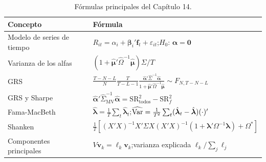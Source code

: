 \begin{table}[H]
\centering\small
\begin{tabular}{@{}ll@{}}
\toprule
Concepto & Fórmula \\
\midrule
Modelo de series de tiempo & $R_{it}=\alpha_i+\boldsymbol\beta_i'\mathbf f_t+\varepsilon_{it}$;\quad $H_0$: $\boldsymbol\alpha=\mathbf 0$ \\
Varianza de los alfas & $(1+\hat{\boldsymbol\mu}'\hat\Omega^{-1}\hat{\boldsymbol\mu})\Sigma/T$ \\
GRS & $\frac{T-N-L}{N}\frac{T}{T-L-1}\frac{\hat{\boldsymbol\alpha}'\hat\Sigma^{-1}\hat{\boldsymbol\alpha}}{1+\hat{\boldsymbol\mu}'\hat\Omega^{-1}\hat{\boldsymbol\mu}}\sim F_{N,T-N-L}$ \\
GRS y Sharpe & $\hat{\boldsymbol\alpha}'\hat\Sigma_{\text{MV}}^{-1}\hat{\boldsymbol\alpha}=\mathrm{SR}^2_{\text{todos}}-\mathrm{SR}^2_f$ \\
Fama-MacBeth & $\hat{\boldsymbol\lambda}=\frac1T\sum_t\hat{\boldsymbol\lambda}_t$;\quad $\widehat{\operatorname{Var}}=\frac{1}{T^2}\sum_t(\hat{\boldsymbol\lambda}_t-\hat{\boldsymbol\lambda})(\cdot)'$ \\
Shanken & $\frac1T[(X'X)^{-1}X'\Sigma X(X'X)^{-1}(1+\boldsymbol\lambda'\Omega^{-1}\boldsymbol\lambda)+\Omega^*]$ \\
Componentes principales & $V\mathbf v_k=\ell_k\mathbf v_k$;\quad varianza explicada $\ell_k/\sum_j\ell_j$ \\
\bottomrule
\end{tabular}
\caption{Fórmulas principales del Capítulo 14.}
\end{table}

